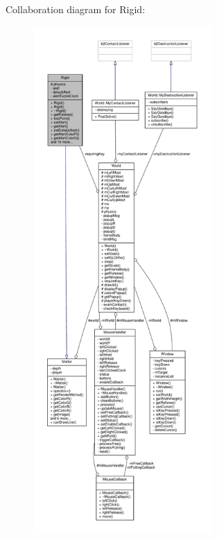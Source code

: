 Collaboration diagram for Rigid\+:
\nopagebreak
\begin{figure}[H]
\begin{center}
\leavevmode
\includegraphics[height=550pt]{classRigid__coll__graph}
\end{center}
\end{figure}
